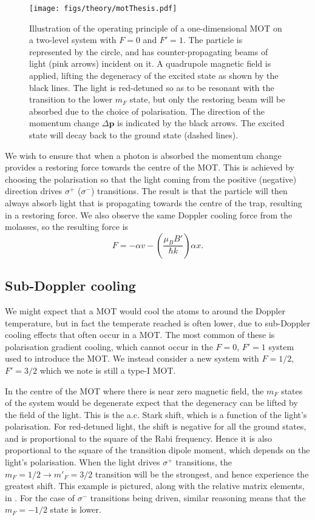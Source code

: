 \begin{figure}[ht]
  \centering
  \texttt{[image: figs/theory/motThesis.pdf]}
  \caption[MOT operating principles]{
    Illustration of the operating principle of a one-dimensional MOT on
    a two-level system with $F=0$ and $F'=1$. The particle is represented by
    the circle, and has counter-propagating beams of light (pink arrows)
    incident on it. A quadrupole magnetic field is applied, lifting the
    degeneracy of the excited state as shown by the black lines. The light is
    red-detuned so as to be resonant with the transition to the lower $m_F$
    state, but only the restoring beam will be absorbed due to the choice of
    polarisation. The direction of the momentum change $\Delta\mathbf{p}$ is
    indicated by the black arrows. The excited state will decay back to the
    ground state (dashed lines).
  }
  \label{theory:fig:MOT}
\end{figure}

We wish to ensure that when a photon is absorbed the momentum change provides a
restoring force towards the centre of the MOT. This is achieved by choosing the
polarisation  so that the light coming from the positive (negative) direction
drives $\sigma^+$ ($\sigma^-$) transitions. The result is
that the particle will then always absorb light that is propagating towards the
centre of the trap, resulting in a restoring force. We also observe the same
Doppler cooling force from the molasses, so the resulting force is
%
\begin{equation}
  F = - \alpha v - \left(\frac{\mu_B B'}{\hbar k}\right)\alpha x.
\end{equation}

\subsection{Sub-Doppler cooling}

We might expect that a MOT would cool the atoms to around the Doppler
temperature, but in fact the temperate reached is often lower, due to
sub-Doppler cooling effects that often occur in a MOT. The most common of these
is polarisation gradient cooling, which cannot occur in the $F=0$, $F'=1$
system used to introduce the MOT. We instead consider a new system with
$F=1/2$, $F'=3/2$ which we note is still a type-I MOT.

In the centre of the MOT where there is near zero magnetic field, the $m_F$
states of the system would be degenerate expect that the degeneracy can be
lifted by the field of the light. This is the a.c. Stark shift, which is a
function of the light's polarisation.
%
For red-detuned light, the shift is negative for all the ground states, and is
proportional to the square of the Rabi frequency. Hence it is also proportional
to the square of the transition dipole moment, which depends on the light's
polarisation.
%
When the light drives $\sigma^+$ transitions, the $m_F=1/2 \rightarrow
m'_F=3/2$ transition will be the strongest, and hence experience the greatest
shift. This example is pictured, along with the relative matrix elements, in 
. For the case of $\sigma^-$ transitions
being driven, similar reasoning means that the $m_F=-1/2$ state is lower.

